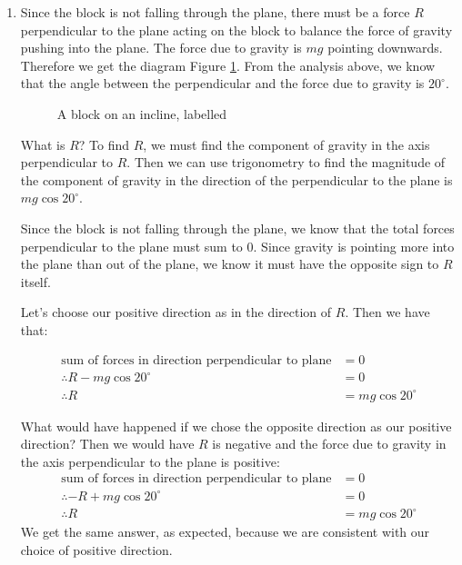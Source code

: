 \begin{solution}
    \begin{enumerate}

        \item 
        Since the block is not falling through the plane, there must be a force $R$ perpendicular to the plane acting on the block to balance the force of gravity pushing into the plane. The force due to gravity is $mg$ pointing downwards.
        Therefore we get the diagram Figure \ref{fig:block-on-plane-no-forces-labelled}. From the analysis above, we know that the angle between the perpendicular and the force due to gravity is $20^\circ$.

        \begin{figure}[H]
            \centering
            \caption{A block on an incline, labelled}
            \label{fig:block-on-plane-no-forces-labelled}
        \end{figure}

        What is $R$? To find $R$, we must find the component of gravity in the axis perpendicular to $R$. 
        Then we can use trigonometry to find the magnitude of the component of gravity in the direction of the perpendicular to the plane is $mg \cos 20^\circ$.

        Since the block is not falling through the plane, we know that the total forces perpendicular to the plane must sum to $0$. Since gravity is pointing more into the plane than out of the plane, we know it must have the opposite sign to $R$ itself.

        Let's choose our positive direction as in the direction of $R$. Then we have that:

        \begin{align*}
            \text{sum of forces in direction perpendicular to plane} &= 0 \\
            \therefore R - mg \cos 20^\circ &= 0\\
            \therefore R &= mg \cos 20^\circ
        \end{align*}

        What would have happened if we chose the opposite direction as our positive direction? Then we would have $R$ is negative and the force due to gravity in the axis perpendicular to the plane is positive:
        \begin{align*}
            \text{sum of forces in direction perpendicular to plane} &= 0 \\
            \therefore -R + mg \cos 20^\circ &= 0\\
            \therefore R &= mg \cos 20^\circ
        \end{align*}
        We get the same answer, as expected, because we are consistent with our choice of positive direction.


\end{enumerate}
\end{solution}
